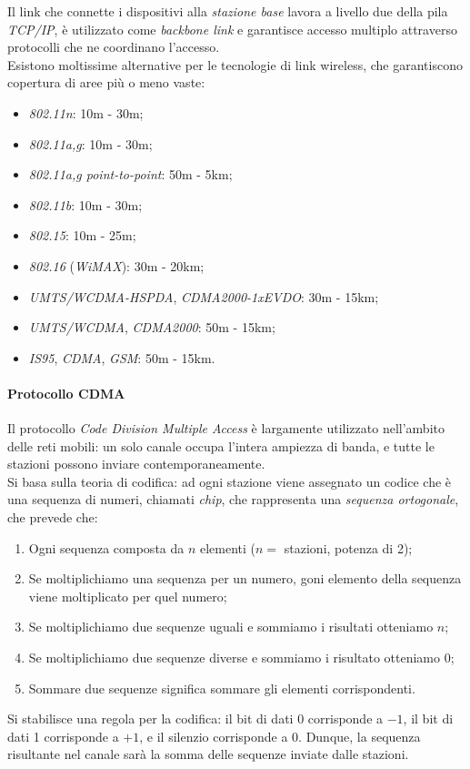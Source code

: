 Il link che connette i dispositivi alla \textit{stazione base} lavora a livello due della pila \textit{TCP/IP}, è utilizzato come \textit{backbone link} e garantisce accesso multiplo attraverso protocolli che ne coordinano l'accesso. \\
Esistono moltissime alternative per le tecnologie di link wireless, che garantiscono copertura di aree più o meno vaste:
\begin{itemize}
	\item \textit{802.11n}: 10m - 30m;
	\item \textit{802.11a,g}: 10m - 30m;
	\item \textit{802.11a,g point-to-point}: 50m - 5km;
	\item \textit{802.11b}: 10m - 30m;
	\item \textit{802.15}: 10m - 25m;
	\item \textit{802.16} (\textit{WiMAX}): 30m - 20km;
	\item \textit{UMTS/WCDMA-HSPDA}, \textit{CDMA2000-1xEVDO}: 30m - 15km;
	\item \textit{UMTS/WCDMA}, \textit{CDMA2000}: 50m - 15km;
	\item \textit{IS95}, \textit{CDMA}, \textit{GSM}: 50m - 15km.
\end{itemize}

\paragraph{Protocollo CDMA}
Il protocollo \textit{Code Division Multiple Access} è largamente utilizzato nell'ambito delle reti mobili: un solo canale occupa l'intera ampiezza di banda, e tutte le stazioni possono inviare contemporaneamente. \\
Si basa sulla teoria di codifica: ad ogni stazione viene assegnato un codice che è una sequenza di numeri, chiamati \textit{chip}, che rappresenta una \textit{sequenza ortogonale}, che prevede che:
\begin{enumerate}
	\item Ogni sequenza composta da $n$ elementi ($n = $ stazioni, potenza di 2);
	\item Se moltiplichiamo una sequenza per un numero, goni elemento della sequenza viene moltiplicato per quel numero;
	\item Se moltiplichiamo due sequenze uguali e sommiamo i risultati otteniamo $n$;
	\item Se moltiplichiamo due sequenze diverse e sommiamo i risultato otteniamo 0;
	\item Sommare due sequenze significa sommare gli elementi corrispondenti.
\end{enumerate}
Si stabilisce una regola per la codifica: il bit di dati 0 corrisponde a $-1$, il bit di dati 1 corrisponde a $+1$, e il silenzio corrisponde a 0. Dunque, la sequenza risultante nel canale sarà la somma delle sequenze inviate dalle stazioni.

